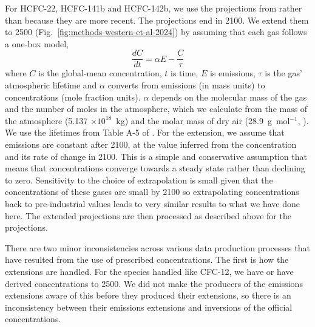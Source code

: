 For HCFC-22, HCFC-141b and HCFC-142b, we use the projections from \citet{western_hcfcs_2024}
rather than \citet{wmo_ozone-ch7_2022} because they are more recent.
The \citet{western_hcfcs_2024} projections end in 2100.
We extend them to 2500 (Fig.~\ref{fig:methods-western-et-al-2024})
by assuming that each gas follows a one-box model,
\begin{equation}
    \label{eq:one-box}
    \frac{dC}{dt} = \alpha E - \frac{C}{\tau}
\end{equation}
where $C$ is the global-mean concentration,
$t$ is time,
$E$ is emissions,
$\tau$ is the gas' atmospheric lifetime
and $\alpha$ converts from emissions (in mass units) to concentrations
(mole fraction units).
$\alpha$ depends on the molecular mass of the gas
and the number of moles in the atmosphere,
which we calculate from the mass of the atmosphere (5.137 $\times 10^{18}$~kg)
and the molar mass of dry air (28.9~g~mol$^{-1}$, \citealp{cdiac_conversion-tables_2003}).
We use the lifetimes from Table A-5 of \citet{wmo_ozone-ch7_2022}.
For the extension, we assume that emissions are constant after 2100,
at the value inferred from the concentration and its rate of change in 2100.
This is a simple and conservative assumption
that means that concentrations converge towards a steady state rather than declining to zero.
Sensitivity to the choice of extrapolation is small given that the concentrations of these gases are small by 2100
so extrapolating concentrations back to pre-industrial values leads to very similar results to what we have done here.
The extended projections are then processed as described above for the \citet{wmo_ozone-ch7_2022} projections.

There are two minor inconsistencies across various data production processes
that have resulted from the use of prescribed concentrations.
The first is how the extensions are handled.
For the species handled like CFC-12, we have or have derived concentrations to 2500.
We did not make the producers of the emissions extensions \citep{sandstad_scenariomip-extensions_2026}
aware of this before they produced their extensions,
so there is an inconsistency between their emissions extensions
and inversions of the official concentrations.

